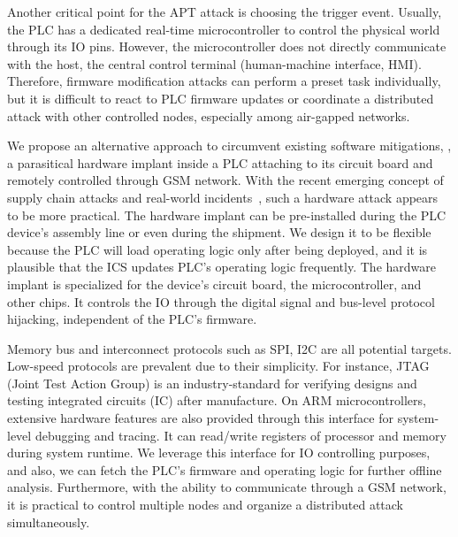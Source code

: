 Another critical point for the APT attack is choosing the trigger event. Usually, the PLC has a dedicated real-time microcontroller to control the physical world through its IO pins. However, the microcontroller does not directly communicate with the host, the central control terminal (human-machine interface, HMI). Therefore, firmware modification attacks can perform a preset task individually, but it is difficult to react to PLC firmware updates or coordinate a distributed attack with other controlled nodes, especially among air-gapped networks.

We propose an alternative approach to circumvent existing software mitigations, \name, a parasitical hardware implant inside a PLC attaching to its circuit board and remotely controlled through GSM network.  With the recent emerging concept of supply chain attacks and real-world incidents~\cite{oxfordsolarwinds}, such a hardware attack appears to be more practical. The hardware implant can be pre-installed during the PLC device's assembly line or even during the shipment. We design it to be flexible because the PLC will load operating logic only after being deployed, and it is plausible that the ICS updates PLC's operating logic frequently. The hardware implant is specialized for the device's circuit board, the microcontroller, and other chips.  It controls the IO through the digital signal and bus-level protocol hijacking, independent of the PLC's firmware.

Memory bus and interconnect protocols such as SPI, I2C are all potential targets. Low-speed protocols are prevalent due to their simplicity. For instance, JTAG (Joint Test Action Group) is an industry-standard for verifying designs and testing integrated circuits (IC) after manufacture. 	On ARM microcontrollers, extensive hardware features are also provided through this interface for system-level debugging and tracing. It can read/write registers of processor and memory during system runtime. We leverage this interface for IO controlling purposes, and also, we can fetch the PLC's firmware and operating logic for further offline analysis. Furthermore, with the ability to communicate through a GSM network, it is practical to control multiple nodes and organize a distributed attack simultaneously.


